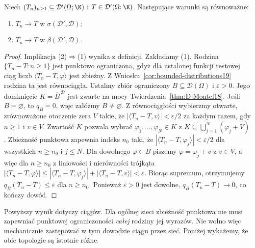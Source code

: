 \begin{twierdzenie}[Zbieżność ciągów: słaba-* = silna]
\label{thm:weak-strong-sequences19}
Niech $(T_n)_{n\ge1}\subseteq\mathcal D'(\Omega;\K)$
i $T\in\mathcal D'(\Omega;\K)$. Następujące warunki
są równoważne:
\begin{enumerate}
\item $T_n\to T$ w $\sigma(\mathcal D',\mathcal D)$;
\item $T_n\to T$ w $\beta(\mathcal D',\mathcal D)$.
\end{enumerate}
\end{twierdzenie}
\begin{proof}
Implikacja (2)$\Rightarrow$(1) wynika z definicji.
Zakładamy (1). Rodzina $\{T_n-T:n\ge1\}$ jest
punktowo ograniczona, gdyż dla ustalonej funkcji
testowej ciąg liczb $\langle T_n-T,\varphi\rangle$
jest zbieżny. Z Wniosku~\ref{cor:bounded-distributions19}
rodzina ta jest równociągła. Ustalmy zbiór ograniczony
$B\subseteq\mathcal D(\Omega)$ i $\varepsilon>0$.
Jego domknięcie $K=\overline B^{\,\mathcal D}$ jest zwarte
na mocy Twierdzenia~\ref{thm:D-Montel18}.
Jeśli $B=\varnothing$, to $q_B=0$, więc załóżmy $B\ne\varnothing$.
Z równociągłości wybierzmy otwarte, zrównoważone otoczenie
zera $V$ takie, że
$|\langle T_n-T,v\rangle|<\varepsilon/2$
za każdym razem, gdy $n\ge1$ i $v\in V$.
Zwartość $K$ pozwala wybrać
$\varphi_1,\ldots,\varphi_N\in K$ z
$K\subseteq\bigcup_{j=1}^N(\varphi_j+V)$.
Zbieżność punktowa zapewnia indeks $n_0$ taki, że
$|\langle T_n-T,\varphi_j\rangle|<\varepsilon/2$
dla wszystkich $n\ge n_0$ i $j\le N$.
Dla dowolnego $\varphi\in B$ piszemy
$\varphi=\varphi_j+v$ z $v\in V$, a więc dla $n\ge n_0$ z liniowości i nierówności trójkąta
$|\langle T_n-T,\varphi\rangle|
\le|\langle T_n-T,\varphi_j\rangle|+|\langle T_n-T,v\rangle|
<\varepsilon$.
Biorąc supremum, otrzymujemy $q_B(T_n-T)\le\varepsilon$
dla $n\ge n_0$. Ponieważ $\varepsilon>0$ jest dowolne,
$q_B(T_n-T)\to0$, co kończy dowód.
\end{proof}

\begin{uwaga}
\label{rem:net-distinction19}
Powyższy wynik dotyczy ciągów. Dla ogólnej sieci
zbieżność punktowa nie musi zapewniać punktowej
ograniczoności \emph{całej} rodziny jej wyrazów.
Nie wolno więc mechanicznie zastępować w tym dowodzie
ciągu przez sieć. Poniżej wykażemy, że obie topologie
są istotnie różne.
\end{uwaga}

